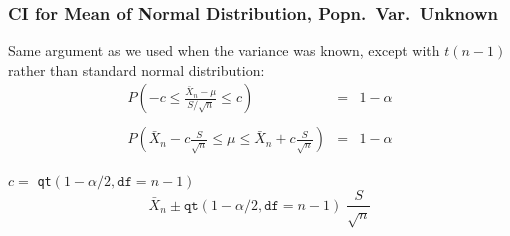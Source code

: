 \documentclass[handout]{beamer}
\begin{document}
\begin{frame}
\frametitle{CI for Mean of Normal Distribution, Popn.\ Var.\ Unknown}
Same argument as we used when the variance was known, except with $t(n-1)$ rather than standard normal distribution:
	\begin{eqnarray*}
		P\left(-c \leq \frac{\bar{X}_n-\mu}{S/\sqrt{n}} \leq c \right) &=& 1-\alpha \\ \\ 
		P\left(\bar{X}_n - c \frac{S}{\sqrt{n}} \leq \mu\leq \bar{X}_n +c \frac{S}{\sqrt{n}} \right) &=& 1-\alpha 
	\end{eqnarray*}

\alert{$c =$ \texttt{qt}$(1-\alpha/2, \texttt{df} = n-1)$} 
	$$\boxed{\bar{X}_n \pm \texttt{qt}(1-\alpha/2, \texttt{df} = n-1)\;  \frac{S}{\sqrt{n}}}$$
\end{frame}
\end{document}
